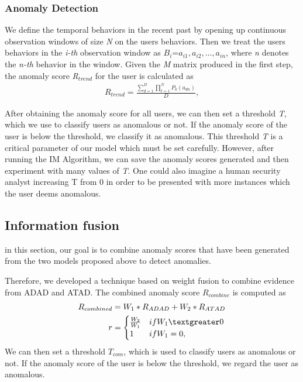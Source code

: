 \documentclass[conference]{IEEEtran}
\begin{document}
\subsubsection{Anomaly Detection}


We define the temporal behaviors in the recent past by opening up continuous observation windows of size \emph{N} on the users behaviors. Then we treat the users behaviors in the \emph{i-th} observation window as \emph{$B_i$}=\emph{$a_{i1},a_{i2},\dots,a_{in}$}, where \emph{n} denotes the \emph{n-th} behavior in the window.
Given the \emph{M} matrix produced in the first step, the anomaly score \emph{R$_{trend}$} for the user is calculated as
\begin{align}
R_{trend}=\frac{\sum_{d=1}^D \prod_{t=1}^N P_k(a_{dn})}{D},
\end{align}


After obtaining the anomaly score for all users, 
we can then set a threshold \emph{T}, which we use to classify users as anomalous or not. If the anomaly score of the user is below the threshold, we classify it as anomalous. This threshold \emph{T} is a critical parameter of our model which must be set carefully.
However, after running the IM Algorithm, we can save the anomaly scores generated and then experiment with many values of \emph{T}. One could also imagine a human security analyst increasing T from 0 in order to be presented with more instances which the user deems anomalous.
\subsection{Information fusion}
in this section, our goal is to combine anomaly scores that have been generated from the two models proposed above to detect anomalies.

Therefore, we developed a technique based on weight fusion to combine evidence from ADAD and ATAD. The combined anomaly score \emph{$R_{combine}$} is computed as
\begin{align}
R_{combined}&= W_1*R_{ADAD}+W_2*R_{ATAD}\\
r&=\begin{cases}
\frac{W_2}{W_1}
&\mbox{if } W_1 \textgreater 0\\
1
&\mbox{if } W_1 = 0,\\
\end{cases}
\end{align}
We can then set a threshold \emph{$T_{com}$}, which is used to classify users as anomalous or not. If the anomaly score of the user is below the threshold, we regard the user as anomalous.
\end{document}
